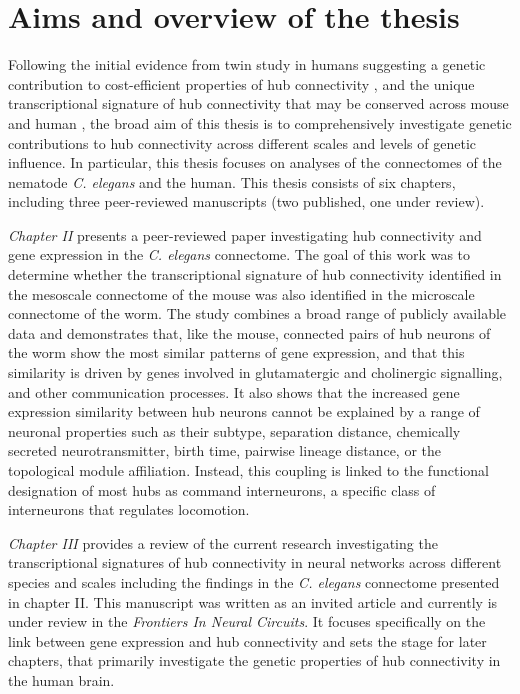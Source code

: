 \section{Aims and overview of the thesis}

Following the initial evidence from twin study in humans suggesting a genetic contribution to cost-efficient properties of hub connectivity \citep{Fornito2011}, and the unique transcriptional signature of hub connectivity that may be conserved across mouse and human \citep{Vertes2016b,Fulcher2016}, the broad aim of this thesis is to comprehensively investigate genetic contributions to hub connectivity across different scales and levels of genetic influence. In particular, this thesis focuses on analyses of the connectomes of the nematode \textit{C. elegans} and the human. This thesis consists of six chapters, including three peer-reviewed manuscripts (two published, one under review).

\textit{Chapter II} presents a peer-reviewed paper investigating hub connectivity and gene expression in the \textit{C. elegans} connectome. The goal of this work was to determine whether the transcriptional signature of hub connectivity identified in the mesoscale connectome of the mouse \citep{Fulcher2016} was also identified in the microscale connectome of the worm. The study combines a broad range of publicly available data and demonstrates that, like the mouse, connected pairs of hub neurons of the worm show the most similar patterns of gene expression, and that this similarity is driven by genes involved in glutamatergic and cholinergic signalling, and other communication processes. It also shows that the increased gene expression similarity between hub neurons cannot be explained by a range of neuronal properties such as their subtype, separation distance, chemically secreted neurotransmitter, birth time, pairwise lineage distance, or the topological module affiliation. Instead, this coupling is linked to the functional designation of most hubs as command interneurons, a specific class of interneurons that regulates locomotion.

\textit{Chapter III} provides a review of the current research investigating the transcriptional signatures of hub connectivity in neural networks across different species and scales including the findings in the \textit{C. elegans} connectome presented in chapter II. This manuscript was written as an invited article and currently is under review in the \textit{Frontiers In Neural Circuits}. It focuses specifically on the link between gene expression and hub connectivity and sets the stage for later chapters, that primarily investigate the genetic properties of hub connectivity in the human brain.

